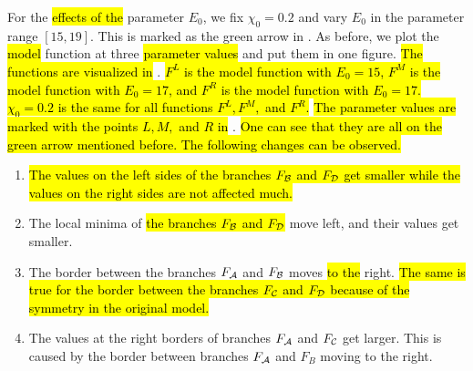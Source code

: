 For the \hl{effects of the} parameter $E_0$, we fix $\chi_0 = 0.2$ and vary $E_0$ in the parameter range $[15, 19]$.
This is marked as the green arrow in .
As before, we plot the \hl{model} function at three \hl{parameter values} and put them in one figure.
\hl{The functions are visualized in} .
\hl{
	$F^L$ is the model function with $E_0 = 15$, $F^M$ is the model function with $E_0 = 17$, and $F^R$ is the model function with $E_0 = 17$.
	$\chi_0 = 0.2$ is the same for all functions $F^L, F^M,$ and $F^R$.
}
\hl{The parameter values are marked with the points $L, M,$ and $R$ in} .
\hl{
	One can see that they are all on the green arrow mentioned before.
	The following changes can be observed.
}
\begin{enumerate}
	\item \hl{
		      The values on the left sides of the branches $F_{\mathcal{B}}$ and $F_{\mathcal{D}}$ get smaller while the values on the right sides are not affected much.
	      }
	\item The local minima of \hl{the branches $F_{\mathcal{B}}$ and $F_{\mathcal{D}}$} move left, and their values get smaller.
	\item The border between the branches $F_{\mathcal{A}}$ and $F_{\mathcal{B}}$ moves \hl{to the} right.
	      \hl{
		      The same is true for the border between the branches $F_{\mathcal{C}}$ and $F_{\mathcal{D}}$ because of the symmetry in the original model.
	      }
	\item The values at the right borders of branches $F_{\mathcal{A}}$ and $F_{\mathcal{C}}$ get larger. This is caused by the border between branches $F_{\mathcal{A}}$ and $F_B$ moving to the right.
\end{enumerate}


